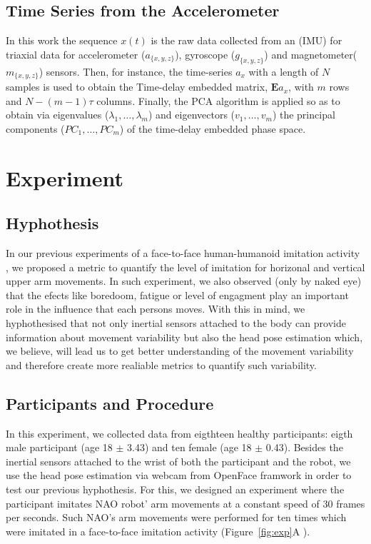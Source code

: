 \documentclass{sigchi}
\begin{document}
\subsection{Time Series from the Accelerometer}
In this work the sequence $x(t)$ is the raw data collected from an (IMU)
for triaxial data for accelerometer ($a_{ \{ x,y,z \} }$),
gyroscope ($g_{ \{ x,y,z \} }$) and magnetometer($m_{ \{ x,y,z \} }$) sensors.
Then, for instance, the time-series $a_x$ with a length of
$N$ samples is used to obtain the Time-delay embedded matrix,
$\boldsymbol{E} a_{x}$, with $m$ rows and $N-(m-1)\tau$ columns.
Finally, the PCA algorithm is applied so as to obtain via eigenvalues
($\lambda_1,\ldots,\lambda_m$) and eigenvectors ($v_1,\ldots,v_m$)
the principal components ($PC_1,\ldots,PC_m$) of the time-delay embedded phase space.

\section{Experiment}

\subsection{Hyphothesis}
In our previous experiments of a face-to-face human-humanoid imitation
activity \cite{XXX2017}, we proposed a metric to quantify the level of
imitation for horizonal and vertical upper arm movements. In such experiment,
we also observed (only by naked eye) that the efects like boredoom,
fatigue or level of engagment play an important role in the influence that each
persons moves.
With this in mind, we hyphothesised that not only inertial sensors attached
to the body can provide information about movement variability
but also the head pose estimation which, we believe, will lead us to get
better understanding of the movement variability and therefore create
more realiable metrics to quantify such variability.


\subsection{Participants and Procedure}
In this experiment, we collected data from eigthteen healthy participants:
eigth male participant (age 18 $\pm$ 3.43) and ten female (age 18 $\pm$ 0.43).
Besides the inertial sensors attached to the wrist of both the participant and the robot,
we use the head pose estimation via webcam from OpenFace framwork in order to
test our previous hyphothesis.
For this, we designed an experiment where the participant imitates
NAO robot' arm movements at a constant speed of 30 frames per seconds.
Such NAO's arm movements were performed for ten times which were imitated
in a face-to-face imitation activity (Figure~\ref{fig:exp}A ).
\end{document}
